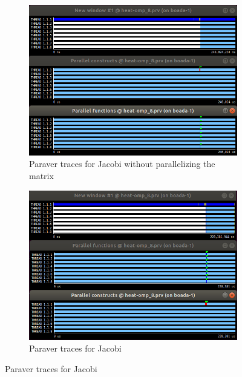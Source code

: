\documentclass[12]{article}
\begin{document}
\begin{center}
    \begin{figure}[H]
\begin{subfigure}{.5\textwidth}
    \centering
    \includegraphics[scale=0.4]{images/nomatrixcopy.PNG}
    \caption{Paraver traces for Jacobi without parallelizing the matrix}
    \label{copymat}
\end{subfigure}
\begin{subfigure}{.5\textwidth}
    \centering
    \includegraphics[scale=0.4]{images/matrixcopy.PNG}
    \caption{Paraver traces for Jacobi}
    \label{scalability_jacobi}
\end{subfigure}
\end{figure}
\end{center}
\end{document}
